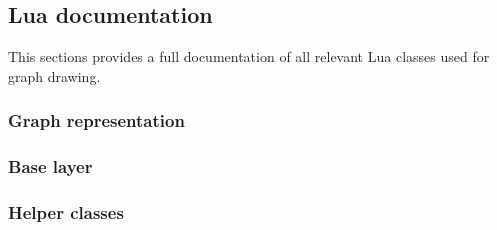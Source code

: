 \subsection{Lua documentation}
This sections provides a full documentation of all relevant Lua classes
used for graph drawing.
\label{section-library-graphdrawing-lua-documentation}
\subsubsection{Graph representation}
\label{section-library-graphdrawing-lua-documentation-graphrep}





%

\subsubsection{Base layer}

\label{section-library-graphdrawing-lua-documentation-interface}

\label{section-library-graphdrawing-lua-documentation-sys}


\subsubsection{Helper classes}

